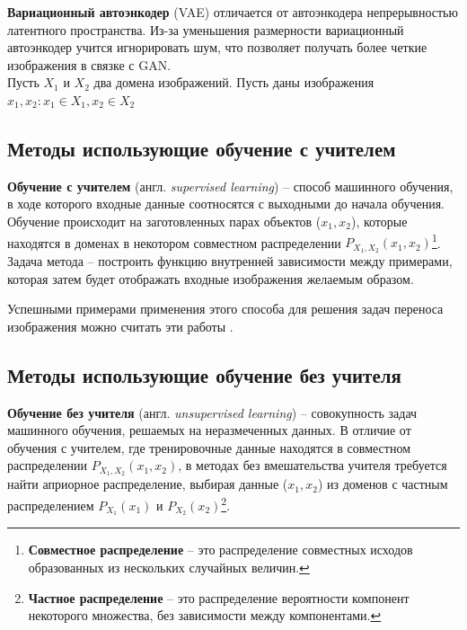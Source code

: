 \documentclass[11pt,a4paper]{extarticle}
\begin{document}
		\textbf{Вариационный автоэнкодер} (VAE) отличается от автоэнкодера непрерывностью латентного пространства.
		Из-за уменьшения размерности вариационный автоэнкодер учится игнорировать шум, что позволяет получать более четкие изображения в связке с GAN.\\

		\noindent
		Пусть \(X_{1}\) и \(X_{2}\) два домена изображений. Пусть даны изображения \(x_{1},x_{2}: x_{1} \in X_{1}, x_{2} \in X_{2}\)%
		\subsection{Методы использующие обучение с учителем}
			\textbf{Обучение с учителем} (англ. \textit{supervised learning}) -- способ машинного обучения, в ходе которого входные данные соотносятся с выходными до начала обучения.
			Обучение происходит на заготовленных парах объектов (\(x_{1},x_{2}\)), которые находятся в доменах в некотором совместном распределении \(P_{X_{1},X_{2}}(x_{1},x_{2})\)\footnote{
				\textbf{Совместное распределение} -- это распределение совместных исходов образованных из нескольких случайных величин.
			}.
			Задача метода -- построить функцию внутренней зависимости между примерами, которая затем будет отображать входные изображения желаемым образом.

			Успешными примерами применения этого способа для решения задач переноса изображения можно считать эти работы \cite{BicycleGAN, pix2pix}.
		

		\subsection{Методы использующие обучение без учителя}
			\textbf{Обучение без учителя} (англ. \textit{unsupervised learning}) -- совокупность задач машинного обучения, решаемых на неразмеченных данных.
			В отличие от обучения с учителем, где тренировочные данные находятся в совместном распределении \(P_{X_{1},X_{2}}(x_{1},x_{2})\), в методах без вмешательства учителя требуется
			найти априорное распределение, выбирая данные (\(x_{1},x_{2}\)) из доменов с частным распределением \(P_{X_{1}}(x_{1})\) и  \(P_{X_{2}}(x_{2})\)\footnote{
				\textbf{Частное распределение} -- это распределение вероятности компонент некоторого множества, без зависимости между компонентами.
			}.
\end{document}
